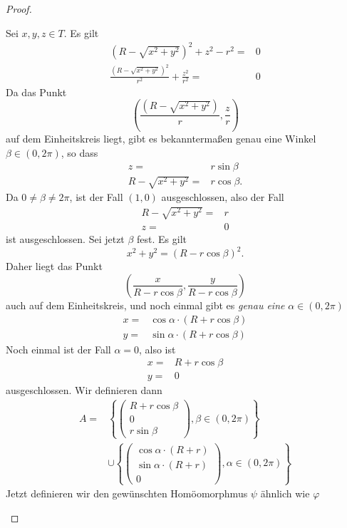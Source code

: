 \begin{proof}
	\begin{parts}
	\item Sei $x,y,z\in T$. Es gilt
		\begin{align*}
			(R-\sqrt{x^2+y^2} )^2+z^2-r^2=&0\\
			\frac{(R-\sqrt{x^2+y^2} )^2}{r^2}+\frac{z^2}{r^2}=&0
		\end{align*}
		Da das Punkt
		\[
			\left(\frac{(R-\sqrt{x^2+y^2} )}{r},\frac{z}{r}\right)
		\]
		auf dem Einheitskreis liegt, gibt es bekanntermaßen genau eine Winkel $\beta\in(0,2\pi)$, so dass
		\begin{align*}
			z=&r\sin\beta\\
			R-\sqrt{x^2+y^2}=&r\cos\beta.
		\end{align*}
		Da $0\neq \beta\neq 2\pi$, ist der Fall $(1,0)$ ausgeschlossen, also der Fall
\begin{align*}
	R-\sqrt{x^2+y^2} =&r\\
	z=&0
\end{align*}
ist ausgeschlossen. Sei jetzt $\beta$ fest. Es gilt
		\[
			x^2+y^2=(R-r\cos\beta)^2
		.\] 
		Daher liegt das Punkt
		\[
			\left( \frac{x}{R-r\cos\beta},\frac{y}{R-r\cos\beta} \right) 
		\]
		auch auf dem Einheitskreis, und noch einmal gibt es \emph{genau eine} $\alpha\in (0,2\pi)$
		\begin{align*}
			x=&\cos\alpha\cdot(R+r\cos\beta)\\
			y=&\sin\alpha\cdot(R+r\cos\beta)
		\end{align*}
		Noch einmal ist der Fall $\alpha=0$, also ist
		\begin{align*}
			x=&R+r\cos\beta\\
			y=&0
		\end{align*}
		ausgeschlossen. Wir definieren dann
		\begin{align*}
		A=& \left\{ \begin{pmatrix} R+r\cos\beta \\ 0 \\ r\sin\beta \end{pmatrix}, \beta\in (0,2\pi) \right\}\\
			  &\cup \left\{ \begin{pmatrix} \cos\alpha \cdot(R+r)\\ \sin\alpha\cdot(R+r)\\0 \end{pmatrix}, \alpha\in (0,2\pi) \right\} 	
		\end{align*}
		Jetzt definieren wir den gewünschten Homöomorphmus $\psi$ ähnlich wie $\varphi$

\end{parts}
\end{proof}
